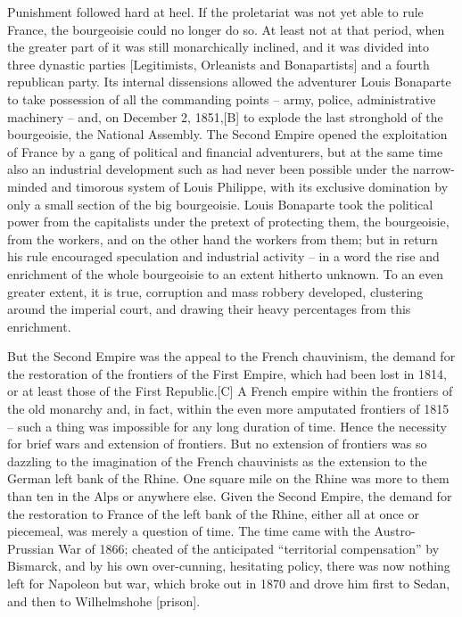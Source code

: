 \documentclass{article}
\begin{document}
Punishment followed hard at heel. If the proletariat was not yet able to
rule France, the bourgeoisie could no longer do so. At least not at that
period, when the greater part of it was still monarchically inclined, and
it was divided into three dynastic parties [Legitimists, Orleanists and
Bonapartists] and a fourth republican party. Its internal dissensions
allowed the adventurer Louis Bonaparte to take possession of all the
commanding points – army, police, administrative machinery – and, on
December 2, 1851,[B] to explode the last stronghold of the bourgeoisie,
the National Assembly. The Second Empire opened the exploitation of France
by a gang of political and financial adventurers, but at the same time
also an industrial development such as had never been possible under the
narrow-minded and timorous system of Louis Philippe, with its exclusive
domination by only a small section of the big bourgeoisie. Louis Bonaparte
took the political power from the capitalists under the pretext of
protecting them, the bourgeoisie, from the workers, and on the other hand
the workers from them; but in return his rule encouraged speculation and
industrial activity – in a word the rise and enrichment of the whole
bourgeoisie to an extent hitherto unknown. To an even greater extent, it
is true, corruption and mass robbery developed, clustering around the
imperial court, and drawing their heavy percentages from this enrichment.

But the Second Empire was the appeal to the French chauvinism, the demand
for the restoration of the frontiers of the First Empire, which had been
lost in 1814, or at least those of the First Republic.[C] A French empire
within the frontiers of the old monarchy and, in fact, within the even
more amputated frontiers of 1815 – such a thing was impossible for any
long duration of time. Hence the necessity for brief wars and extension of
frontiers. But no extension of frontiers was so dazzling to the
imagination of the French chauvinists as the extension to the German left
bank of the Rhine. One square mile on the Rhine was more to them than ten
in the Alps or anywhere else. Given the Second Empire, the demand for the
restoration to France of the left bank of the Rhine, either all at once or
piecemeal, was merely a question of time. The time came with the
Austro-Prussian War of 1866; cheated of the anticipated “territorial
compensation” by Bismarck, and by his own over-cunning, hesitating policy,
there was now nothing left for Napoleon but war, which broke out in 1870
and drove him first to Sedan, and then to Wilhelmshohe [prison].
\end{document}
